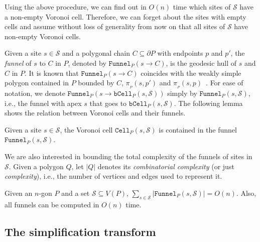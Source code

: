 \documentclass[a4paper,UKenglish]{socg-lipics-v2018}
\newcommand{\s}{\mathcal S}
\newcommand{\p}[3][P]{\ensuremath{\pi_{_{#1}}(#2, #3)}}
\newcommand{\funnel}[2][P]{\ensuremath{\mathtt{Funnel}_{\scriptscriptstyle #1}(#2)}}
\newcommand{\cell}[2][P]{\ensuremath{\mathtt{Cell}_{\scriptscriptstyle #1}(#2)}}
\newcommand{\bcell}[2][P]{\ensuremath{\mathtt{bCell}_{\scriptscriptstyle #1}(#2)}}
\begin{document}
Using the above procedure, we can find out in $O(n)$ time which sites of $\s$ have a non-empty Voronoi cell. 
Therefore, we can forget about the sites with empty cells and assume without loss of generality from now on that all sites of $\s$ have non-empty Voronoi cells.

Given a site $s\in \s$ and a polygonal chain $C \subseteq \partial P$ with endpoints $p$ and $p'$, the \emph{funnel} of $s$ to $C$ in $P$, denoted by $\funnel{s\to C}$, 
is the geodesic hull of $s$ and $C$ in $P$. 
It is known that $\funnel{s\to C}$ coincides with the weakly simple polygon contained in $P$ bounded by $C$, $\p{s}{p'}$ and $\p{s}{p}$~\cite{ahn2015linear}.
For ease of notation, we denote $\funnel{s \to \bcell{s, \s}}$ simply by $\funnel{s, \s}$, i.e., the funnel with apex $s$ that goes to $\bcell{s, \s}$.
The following lemma shows the relation between Voronoi cells and their funnels.


\begin{lemma}\label{lemma:Voronoi cell in funnel}
Given a site $s\in \s$, the Voronoi cell $\cell{s, \s}$ is contained in the funnel $\funnel{s, \s}$.
\end{lemma}

We are also interested in bounding the total complexity of the funnels of sites in $\s$.
Given a polygon $Q$, let $|Q|$ denotes its \emph{combinatorial complexity} (or just \emph{complexity}), i.e., the number of vertices and edges used to represent it. 

\begin{lemma}\label{lemma:Complexity of funnels}
Given an $n$-gon $P$ and a set $\s\subseteq V(P)$, $\sum_{s\in \s} |\funnel{s, \s}| = O(n)$.
Also, all funnels can be computed in $O(n)$ time. 
\end{lemma}

\subsection{The simplification transform}\label{section:Simplification}
\end{document}
